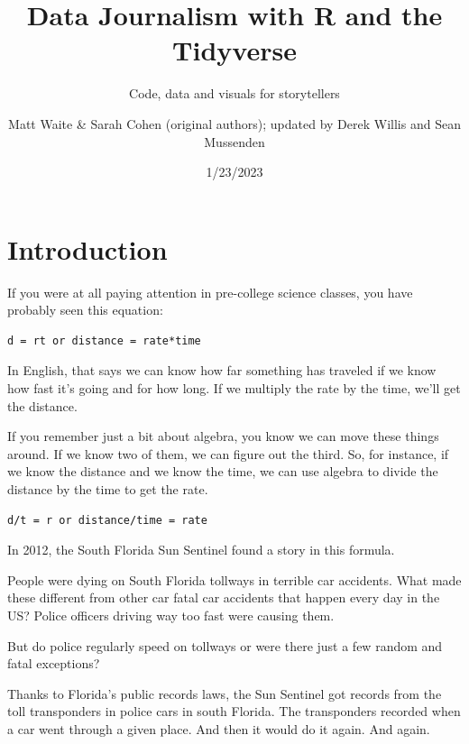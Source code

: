 \documentclass[
  letterpaper,
  DIV=11,
  numbers=noendperiod]{scrreprt}
\title{Data Journalism with R and the Tidyverse}
\subtitle{Code, data and visuals for storytellers}
\author{Matt Waite \& Sarah Cohen (original authors); updated by Derek
Willis and Sean Mussenden}
\date{1/23/2023}
\renewcommand*\contentsname{Table of contents}
\newcommand\contentsname{Table of contents}
\begin{document}
\maketitle
\ifdefined\Shaded\renewenvironment{Shaded}{\begin{tcolorbox}[boxrule=0pt, borderline west={3pt}{0pt}{shadecolor}, sharp corners, frame hidden, interior hidden, enhanced, breakable]}{\end{tcolorbox}}\fi

\renewcommand*\contentsname{Table of contents}
{
\hypersetup{linkcolor=}
\setcounter{tocdepth}{2}
\tableofcontents
}

\hypertarget{introduction}{%
\chapter{Introduction}\label{introduction}}

If you were at all paying attention in pre-college science classes, you
have probably seen this equation:

\begin{verbatim}
d = rt or distance = rate*time
\end{verbatim}

In English, that says we can know how far something has traveled if we
know how fast it's going and for how long. If we multiply the rate by
the time, we'll get the distance.

If you remember just a bit about algebra, you know we can move these
things around. If we know two of them, we can figure out the third. So,
for instance, if we know the distance and we know the time, we can use
algebra to divide the distance by the time to get the rate.

\begin{verbatim}
d/t = r or distance/time = rate
\end{verbatim}

In 2012, the South Florida Sun Sentinel found a story in this formula.

People were dying on South Florida tollways in terrible car accidents.
What made these different from other car fatal car accidents that happen
every day in the US? Police officers driving way too fast were causing
them.

But do police regularly speed on tollways or were there just a few
random and fatal exceptions?

Thanks to Florida's public records laws, the Sun Sentinel got records
from the toll transponders in police cars in south Florida. The
transponders recorded when a car went through a given place. And then it
would do it again. And again.
\end{document}
